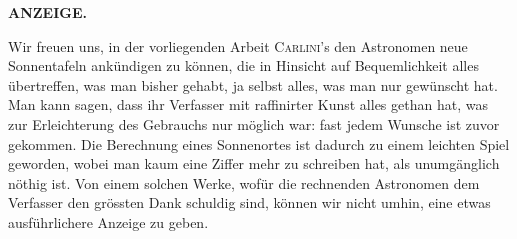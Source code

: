 \clearpage
\noindent{}%
%
\parbox[t]{\dimexpr\linewidth-24mm\relax}{\centering\footnotesize\bfseries ANZEIGE.\par}%
\makebox[12mm][r]{}\par\nobreak\medskip
Wir freuen uns, in der vorliegenden Arbeit \textsc{Carlini}'s den Astronomen neue Sonnentafeln ankündigen zu können, die in Hinsicht auf Bequemlichkeit alles übertreffen, was man bisher gehabt, ja selbst alles, was man nur gewünscht hat. Man kann sagen, dass ihr Verfasser mit raffinirter Kunst alles gethan hat, was zur Erleichterung des Gebrauchs nur möglich war: fast jedem Wunsche ist zuvor gekommen. Die Berechnung eines Sonnenortes ist dadurch zu einem leichten Spiel geworden, wobei man kaum eine Ziffer mehr zu schreiben hat, als unumgänglich nöthig ist. Von einem solchen Werke, wofür die rechnenden Astronomen dem Verfasser den grössten Dank schuldig sind, können wir nicht umhin, eine etwas ausführlichere Anzeige zu geben.

